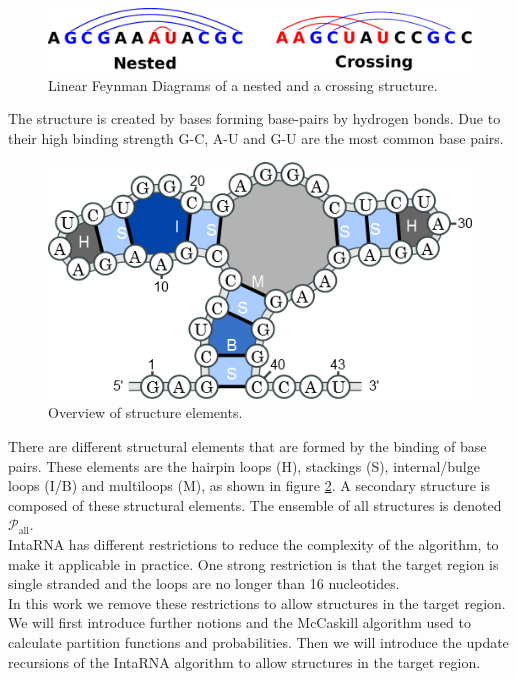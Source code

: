 \documentclass[11pt,a4paper]{report}
\newcommand{\str}{P} %
\newcommand{\ens}{\mathcal{\str}} %
\newcommand{\ensAll}{\ens_{\text{all}}} %
\begin{document}
\begin{figure}[H]
\centering 
\includegraphics[scale=0.6]{NestedCrossing.pdf}
\caption{Linear Feynman Diagrams of a nested and a crossing structure.}
\label{Nested}
\end{figure}
\noindent
The structure is created by bases forming base-pairs by hydrogen bonds. Due to their high binding strength G-C, A-U and G-U are the most common base pairs.\\
\begin{figure}[H]
\centering
\includegraphics[scale=0.5]{structure-loops.png}
\caption{Overview of structure elements. \citep{ELearn}}
\label{Structure}
\end{figure}
\noindent
There are different structural elements that are formed by the binding of base pairs. These elements are the hairpin loops (H), stackings (S), internal/bulge loops (I/B) and multiloops (M), as shown in figure \ref{Structure}.
A secondary structure is composed of these structural elements.
The ensemble of all structures is denoted $\ensAll$.\\
IntaRNA has different restrictions to reduce the complexity of the algorithm, to make it applicable in practice. One strong restriction is that the target region is single stranded and the loops are no longer than 16 nucleotides.\\
In this work we remove these restrictions to allow structures in the target region. We will first introduce further notions and the McCaskill algorithm \citep{McCaskill} used to calculate partition functions and probabilities. Then we will introduce the update recursions of the IntaRNA algorithm to allow structures in the target region.\\
\end{document}
